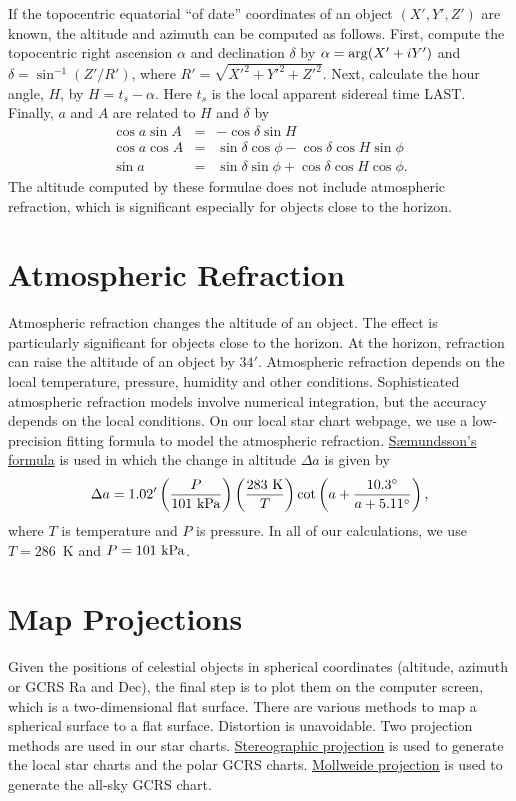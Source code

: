 \documentclass[12pt]{article}
\newcommand \beq {\begin{equation}}
\newcommand \eeq {\end{equation}}
\newcommand \beqn {\begin{eqnarray}}
\newcommand \eeqn {\end{eqnarray}}
\begin{document}
If the topocentric equatorial ``of date'' coordinates of an object $(X',Y',Z')$ 
are known, the altitude and azimuth can be computed as follows. First, compute the 
topocentric right ascension $\alpha$ and declination $\delta$ by 
$\alpha = {\rm arg}(X' + i Y')$ and $\delta = \sin^{-1}(Z'/R')$, where 
$R'=\sqrt{X'^2+Y'^2+Z'^2}$.
Next, calculate the hour angle, $H$, by $H=t_s-\alpha$. Here $t_s$ 
is the local apparent sidereal time LAST. 
Finally, $a$ and $A$ are related to $H$ and $\delta$ by 
\beqn
  \cos a \sin A &=& -\cos \delta \sin H \label{eq:aAFromHdel1} \\
  \cos a \cos A &=& \sin \delta \cos \phi - \cos \delta \cos H \sin \phi 
\label{eq:aAFromHdel2} \\
  \sin a &=& \sin \delta \sin \phi + \cos \delta \cos H \cos \phi .
\label{eq:aAFromHdel3}
\eeqn
The altitude computed by these formulae does not include atmospheric refraction, 
which is significant especially for objects close to the horizon.

\section{Atmospheric Refraction}

Atmospheric refraction changes the altitude of an object. The effect is particularly 
significant for objects close to the horizon. At the horizon, refraction 
can raise the altitude of an object by $34'$. Atmospheric refraction 
depends on the local temperature, pressure, humidity and other conditions. 
Sophisticated atmospheric refraction models involve numerical integration, 
but the accuracy depends on the local conditions.
On our local star chart webpage, we use a low-precision fitting formula 
to model the atmospheric refraction. 
\href{https://en.wikipedia.org/wiki/Atmospheric_refraction#cite_note-Saemundsson1986-24}{S{\ae}mundsson's formula} 
is used in which the change in altitude $\Delta a$ is given by 
\beq
  \Delta a = 1.02' \left(\frac{P}{101~{\rm kPa}}\right) 
\left( \frac{283~{\rm K}}{T}\right)  
\cot \left(a + \frac{10.3^\circ}{a + 5.11^\circ}\right) ,
\label{eq:atmRefraction}
\eeq
where $T$ is temperature and $P$ is pressure. In all of our calculations, 
we use $T=286$~K and $P=101~{\rm kPa}$.

\section{Map Projections}
\label{sec:maps}

Given the positions of celestial objects in spherical coordinates (altitude, 
azimuth or GCRS Ra and Dec), the final step is to plot them on the computer 
screen, which is a two-dimensional flat surface. There are various methods 
to map a spherical surface to a flat surface. Distortion is unavoidable. 
Two projection methods are used in our star charts. 
\href{https://en.wikipedia.org/wiki/Stereographic_projection}{Stereographic projection} 
is used to generate the local star charts and the polar GCRS charts. 
\href{https://en.wikipedia.org/wiki/Mollweide_projection}{Mollweide projection} 
is used to generate the all-sky GCRS chart. 
\end{document}
